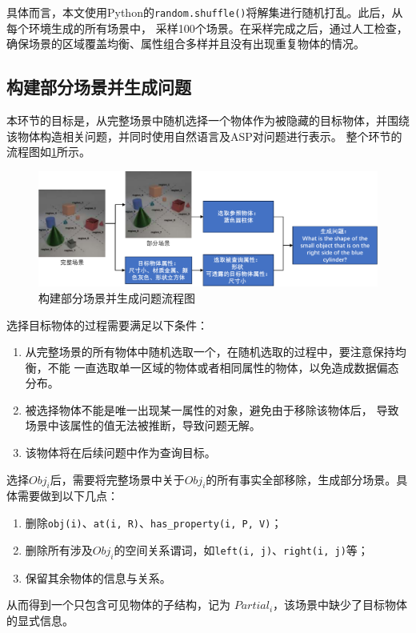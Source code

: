 \begin{enumerate}[nosep]
具体而言，本文使用Python的\texttt{random.shuffle()}将解集进行随机打乱。此后，从每个环境生成的所有场景中，
采样100个场景。在采样完成之后，通过人工检查，确保场景的区域覆盖均衡、属性组合多样并且没有出现重复物体的情况。
\end{enumerate}
\subsection{构建部分场景并生成问题}
本环节的目标是，从完整场景中随机选择一个物体作为被隐藏的目标物体，并围绕该物体构造相关问题，并同时使用自然语言及ASP对问题进行表示。
整个环节的流程图如\ref{generate-partial-scenes-and-questions}所示。
\begin{figure}
\centering
\includegraphics[scale=0.6]{figures/部分场景及问题生成-crop.pdf}
\caption{构建部分场景并生成问题流程图}
\label{generate-partial-scenes-and-questions}
\end{figure}

选择目标物体的过程需要满足以下条件：
\begin{enumerate}[nosep]
\item 从完整场景的所有物体中随机选取一个，在随机选取的过程中，要注意保持均衡，不能
一直选取单一区域的物体或者相同属性的物体，以免造成数据偏态分布。
\item 被选择物体不能是唯一出现某一属性的对象，避免由于移除该物体后，
导致场景中该属性的值无法被推断，导致问题无解。
\item 该物体将在后续问题中作为查询目标。
\end{enumerate}

选择$Obj_i$后，需要将完整场景中关于$Obj_i$的所有事实全部移除，生成部分场景。具体需要做到以下几点：
\begin{enumerate}[nosep]
\item 删除\texttt{obj(i)}、\texttt{at(i, R)}、\texttt{has\_property(i, P, V)}；
\item 删除所有涉及$Obj_i$的空间关系谓词，如\texttt{left(i, j)}、\texttt{right(i, j)}等；
\item 保留其余物体的信息与关系。
\end{enumerate}
从而得到一个只包含可见物体的子结构，记为 $Partial_i$，该场景中缺少了目标物体的显式信息。


